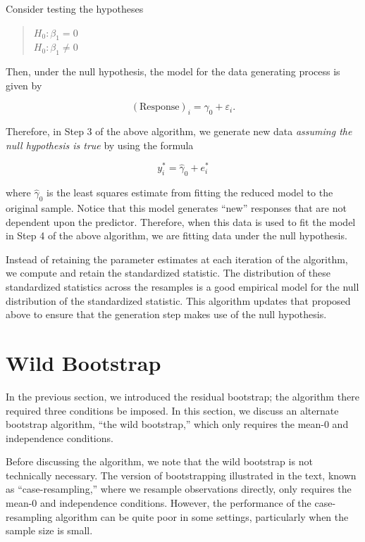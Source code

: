 \documentclass[
  letterpaper,
  DIV=11,
  numbers=noendperiod]{scrreprt}
\theoremstyle{plain}
\theoremstyle{definition}
\theoremstyle{definition}
\theoremstyle{remark}
\begin{document}
Consider testing the hypotheses

\begin{quote}
\(H_0: \beta_1 = 0\)\\
\(H_0: \beta_1 \neq 0\)
\end{quote}

Then, under the null hypothesis, the model for the data generating
process is given by

\[(\text{Response})_i = \gamma_0 + \varepsilon_i.\]

Therefore, in Step 3 of the above algorithm, we generate new data
\emph{assuming the null hypothesis is true} by using the formula

\[y_i^* = \widehat{\gamma}_0 + e_i^*\]

where \(\widehat{\gamma}_0\) is the least squares estimate from fitting
the reduced model to the original sample. Notice that this model
generates ``new'' responses that are not dependent upon the predictor.
Therefore, when this data is used to fit the model in Step 4 of the
above algorithm, we are fitting data under the null hypothesis.

Instead of retaining the parameter estimates at each iteration of the
algorithm, we compute and retain the standardized statistic. The
distribution of these standardized statistics across the resamples is a
good empirical model for the null distribution of the standardized
statistic. This algorithm updates that proposed above to ensure that the
generation step makes use of the null hypothesis.

\hypertarget{wild-bootstrap}{%
\section{Wild Bootstrap}\label{wild-bootstrap}}

In the previous section, we introduced the residual bootstrap; the
algorithm there required three conditions be imposed. In this section,
we discuss an alternate bootstrap algorithm, ``the wild bootstrap,''
which only requires the mean-0 and independence conditions.

Before discussing the algorithm, we note that the wild bootstrap is not
technically necessary. The version of bootstrapping illustrated in the
text, known as ``case-resampling,'' where we resample observations
directly, only requires the mean-0 and independence conditions. However,
the performance of the case-resampling algorithm can be quite poor in
some settings, particularly when the sample size is small.
\end{document}
